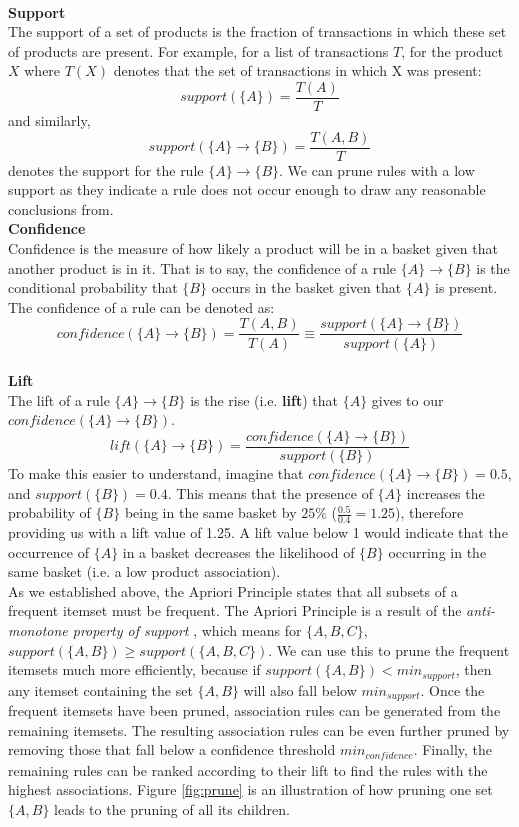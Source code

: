 \documentclass[a4paper,11pt]{article}
\newcommand{\setA}{\{A\}}
\newcommand{\setB}{\{B\}}
\newcommand{\abrule}{\setA\rightarrow\setB}
\begin{document}
\\\textbf{Support}\\
The support of a set of products is the fraction of transactions in which these set of products are present. For example,  for a list of transactions $T$, for the product $X$ where $T(X)$ denotes that the set of transactions in which X was present:
\[
\textit{support}(\{A\}) = \frac{T(A)}{T}
\]
and similarly, 
\[
\textit{support}(\abrule) = \frac{T(A,B)}{T}
\]
denotes the support for the rule $\abrule$. We can prune rules with a low support as they indicate a rule does not occur enough to draw any reasonable conclusions from.
\\\textbf{Confidence}\\
Confidence is the measure of how likely a product will be in a basket given that another product is in it. That is to say,  the confidence of a rule $\abrule$ is the conditional probability that $\setB$ occurs in the basket given that $\setA$ is present. The confidence of a rule can be denoted as:
\[
\textit{confidence}(\abrule) = \frac{T(A, B)}{T(A)} \equiv \frac{\textit{support}(\abrule)}{\textit{support}(\setA)}
\]
\\\textbf{Lift}\\
The lift of a rule $\abrule$ is the rise (i.e. \textbf{lift}) that $\setA$ gives to our $\textit{confidence}(\abrule)$.
\[
\textit{lift}(\abrule) = \frac{confidence(\abrule)}{support(\setB)}
\]
To make this easier to understand, imagine that $\textit{confidence}(\abrule)=0.5$, and $\textit{support}(\setB)=0.4.$ This means that the presence of $\setA$ increases the probability of $\setB$ being in the same basket by $25\%$ ($\frac{0.5}{0.4}=1.25$), therefore providing us with a lift value of 1.25.  A lift value below 1 would indicate that the occurrence of $\setA$ in a basket decreases the likelihood of $\setB$ occurring in the same basket (i.e. a low product association).
\\
As we established above,  the Apriori Principle states that all subsets of a frequent itemset must be frequent.  The Apriori Principle is a result of the \textit{anti-monotone property of support} \cite{anti_monotone}, which means for $\{A,B,C\}$, $\textit{support}(\{A,B\}) \geq \textit{support}(\{A,B,C\})$.  We can use this to prune the frequent itemsets much more efficiently, because if $support(\{A,B\}) < \textit{min}_{\textit{support}}$, then any itemset containing the set $\{A,B\}$ will also fall below $\textit{min}_{\textit{support}}$. Once the frequent itemsets have been pruned,  association rules can be generated from the remaining itemsets.  The resulting association rules can be even further pruned by removing those that fall below a confidence threshold $\textit{min}_{\textit{confidence}}$.  Finally, the remaining rules can be ranked according to their  lift to find the rules with the highest associations.  Figure \ref{fig:prune} is an illustration of how pruning one set $\{A, B\}$ leads to the pruning of all its children.
\end{document}
